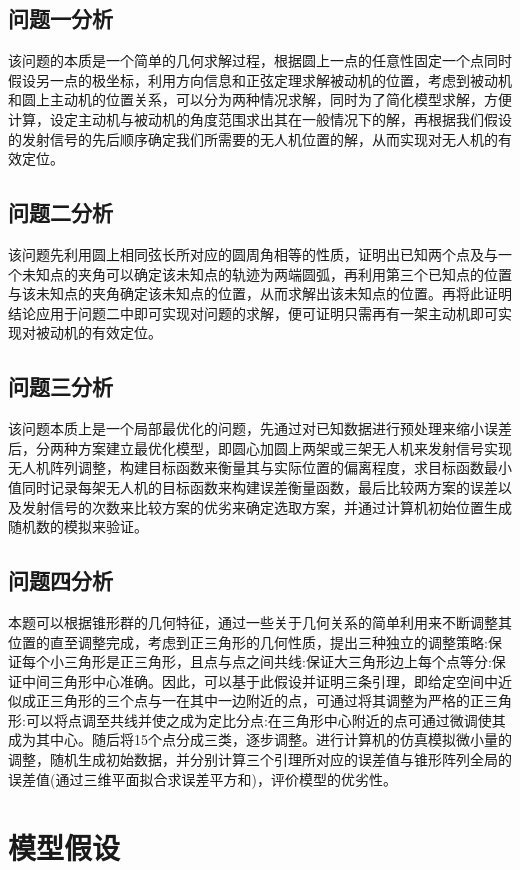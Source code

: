 \documentclass[withoutpreface,bwprint]{cumcmthesis} %
\begin{document}
\subsection{问题一分析}
该问题的本质是一个简单的几何求解过程，根据圆上一点的任意性固定一个点同时假设另一点的极坐标，利用方向信息和正弦定理求解被动机的位置，考虑到被动机和圆上主动机的位置关系，可以分为两种情况求解，同时为了简化模型求解，方便计算，设定主动机与被动机的角度范围求出其在一般情况下的解，再根据我们假设的发射信号的先后顺序确定我们所需要的无人机位置的解，从而实现对无人机的有效定位。

\subsection{问题二分析}
该问题先利用圆上相同弦长所对应的圆周角相等的性质，证明出已知两个点及与一个未知点的夹角可以确定该未知点的轨迹为两端圆弧，再利用第三个已知点的位置与该未知点的夹角确定该未知点的位置，从而求解出该未知点的位置。再将此证明结论应用于问题二中即可实现对问题的求解，便可证明只需再有一架主动机即可实现对被动机的有效定位。

\subsection{问题三分析}
该问题本质上是一个局部最优化的问题，先通过对已知数据进行预处理来缩小误差后，分两种方案建立最优化模型，即圆心加圆上两架或三架无人机来发射信号实现无人机阵列调整，构建目标函数来衡量其与实际位置的偏离程度，求目标函数最小值同时记录每架无人机的目标函数来构建误差衡量函数，最后比较两方案的误差以及发射信号的次数来比较方案的优劣来确定选取方案，并通过计算机初始位置生成随机数的模拟来验证。

\subsection{问题四分析}
本题可以根据锥形群的几何特征，通过一些关于几何关系的简单利用来不断调整其位置的直至调整完成，考虑到正三角形的几何性质，提出三种独立的调整策略:保证每个小三角形是正三角形，且点与点之间共线:保证大三角形边上每个点等分:保证中间三角形中心准确。因此，可以基于此假设并证明三条引理，即给定空间中近似成正三角形的三个点与一在其中一边附近的点，可通过将其调整为严格的正三角形:可以将点调至共线并使之成为定比分点:在三角形中心附近的点可通过微调使其成为其中心。随后将15个点分成三类，逐步调整。进行计算机的仿真模拟微小量的调整，随机生成初始数据，并分别计算三个引理所对应的误差值与锥形阵列全局的误差值(通过三维平面拟合求误差平方和)，评价模型的优劣性。
\section{模型假设}
\end{document}
